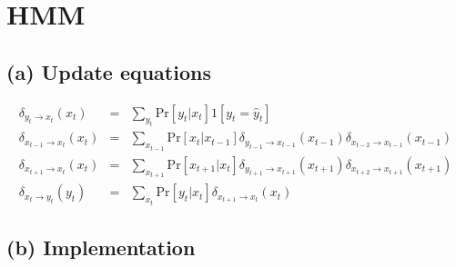 \documentclass[a4paper]{article}
\begin{document}
\section{HMM}

\subsection{(a) Update equations}

\begin{align*}
\delta_{y_t \rightarrow x_t}(x_t) &=& \sum_{y_t} \mathrm{Pr}\left[ y_t | x_t \right] 
\mathcal{1} \left[y_t = \hat{y}_t\right] \\
\delta_{x_{t - 1} \rightarrow x_t}(x_t) &=& \sum_{x_{t - 1}} \mathrm{Pr}\left[ x_t | x_{t - 1} \right] 
\delta_{y_{t-1} \rightarrow x_{t - 1}}(x_{t-1}) \delta_{x_{t - 2} \rightarrow x_{t - 1}}(x_{t - 1}) \\
\delta_{x_{t + 1} \rightarrow x_{t}}(x_t) &=& \sum_{x_{t + 1}} \mathrm{Pr}\left[ x_{t + 1} | x_t \right]
\delta_{y_{t + 1} \rightarrow x_{t + 1}}(x_{t + 1}) \delta_{x_{t + 2} \rightarrow x_{t + 1}}(x_{t + 1}) \\
\delta_{x_t \rightarrow y_t}(y_t) &=& \sum_{x_t} \mathrm{Pr} \left[ y_t | x_t \right] 
\delta_{x_{t + 1} \rightarrow x_t}(x_t)
\end{align*}


\subsection{(b) Implementation}
\end{document}
